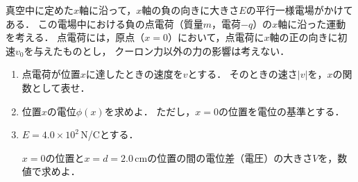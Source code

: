 \documentclass[../../../physics-standard_questions_all.tex]{subfiles}
\begin{document}
真空中に定めた$x$軸に沿って，$x$軸の負の向きに大きさ$E$の平行一様電場がかけてある．
この電場中における負の点電荷（質量$m$，電荷$-q$）の$x$軸に沿った運動を考える．
点電荷には，原点（$x=0$）において，点電荷に$x$軸の正の向きに初速$v_0$を与えたものとし，
クーロン力以外の力の影響は考えない．

\begin{enumerate}

    \item 点電荷が位置$x$に達したときの速度を$v$とする．
    そのときの速さ$|v|$を，$x$の関数として表せ．

    \item 位置$x$の電位$\phi(x)$を求めよ．
    ただし，$x=0$の位置を電位の基準とする．

    \item $E=4.0 \times 10^2$\,N/Cとする．\par    
    $x=0$の位置と$x=d=2.0$\,cmの位置の間の電位差（電圧）の大きさ$V$を，数値で求めよ．

\end{enumerate}
\end{document}
